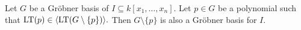 \begin{lemma}\label{lem:grobner_basis_remove_redundant} %
    Let $G$ be a Gr{\"o}bner basis of $I \subseteq k[x_1, \ldots, x_n]$.  
    Let $p \in G$ be a polynomial such that $\operatorname{LT}(p) \in \langle \operatorname{LT}(G \setminus \{p\}) \rangle.$  
    Then $G \setminus \{p\}$ is also a Gr{\"o}bner basis for $I$.
\end{lemma}
    